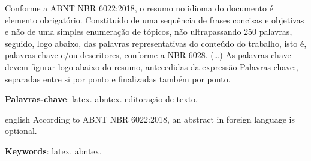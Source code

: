 \documentclass[
	article,			%
	11pt,				%
	oneside,			%
	a4paper,			%
	english,			%
	brazil,				%
	sumario=tradicional	
	]{abntex2}
\begin{document}

\frenchspacing 


%
%

\maketitle





\begin{resumoumacoluna}
 Conforme a ABNT NBR 6022:2018, o resumo no idioma do documento é elemento obrigatório. 
 Constituído de uma sequência de frases concisas e objetivas e não de uma 
 simples enumeração de tópicos, não ultrapassando 250 palavras, seguido, logo 
 abaixo, das palavras representativas do conteúdo do trabalho, isto é, 
 palavras-chave e/ou descritores, conforme a NBR 6028. (\ldots) As 
 palavras-chave devem figurar logo abaixo do resumo, antecedidas da expressão 
 Palavras-chave:, separadas entre si por ponto e finalizadas também por ponto.
 
 \vspace{\onelineskip}
 
 \noindent
 \textbf{Palavras-chave}: latex. abntex. editoração de texto.
\end{resumoumacoluna}


\renewcommand{\resumoname}{Abstract}
\begin{resumoumacoluna}
 \begin{otherlanguage*}{english}
   According to ABNT NBR 6022:2018, an abstract in foreign language is optional.

   \vspace{\onelineskip}
 
   \noindent
   \textbf{Keywords}: latex. abntex.
 \end{otherlanguage*}  
\end{resumoumacoluna}
\end{document}
